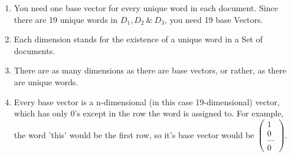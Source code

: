 \documentclass{WeSTassignment}
\begin{document}
\begin{enumerate}
\item You need one base vector for every unique word in each document. Since there are 19 unique words in $D_1, D_2~\&~D_3$, you need 19 base Vectors.
\item Each dimension stands for the existence of a unique word in a Set of documents.
\item There are as many dimensions as there are base vectors, or rather, as there are unique words.
\item Every base vector is a n-dimensional (in this case 19-dimensional) vector, which has only 0's except in the row the word is assigned to. For example, the word 'this' would be the first row, so it's base vector would be $\begin{pmatrix} 1 \\ 0 \\ ... \\ 0 \end{pmatrix}$.\\


\end{enumerate}
\end{document}
